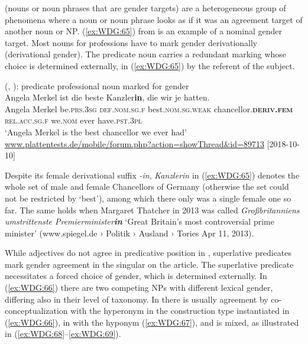 \documentclass[output=collectionpaper]{langsci/langscibook}
\begin{document}
%

 (nouns or noun phrases that are gender targets) are a heterogeneous group of phenomena where a noun or noun phrase looks as if it was an agreement target of another noun or NP. (\ref{ex:WDG:65}) from  is an example of a nominal gender target. Most  nouns for professions have to mark gender derivationally (derivational gender). The predicate noun carries a redundant marking whose choice is determined externally, in (\ref{ex:WDG:65}) by the referent of the subject.

\ea\label{ex:WDG:65}
 (, ): predicate professional noun marked for gender\\
\gll Angela	Merkel	ist	die	beste	Kanzler\textbf{in},	die	wir	je	hatten.\\
Angela	Merkel	be.\textsc{prs.3sg}	\textsc{def.nom.sg.f}	best.\textsc{nom.sg.weak}	chancellor.\textbf{\textsc{deriv.fem}}	\textsc{rel.acc.sg.f}	we.\textsc{nom}	ever	have\textsc{.pst.3pl}\\
\glt `Angela Merkel is the best chancellor we ever had'\\
\url{www.plattentests.de/mobile/forum.php?action=showThread&id=89713} [2018-10-10]\\
\z

Despite its female derivational suffix \textit{-in}, \textit{Kanzlerin} in (\ref{ex:WDG:65}) denotes the whole set of male and female Chancellors of Germany (otherwise the set could not be restricted by `best'), among which there only was a single female one so far. The same holds when Margaret Thatcher in 2013 was called \textit{Großbritanniens umstrittenste Premierminister\textbf{in}} `Great Britain's most controversial prime minister' (www.spiegel.de › Politik › Ausland › Tories Apr 11, 2013).

While adjectives do not agree in predicative position in , superlative predicates mark gender agreement in the singular on the article. The superlative predicate necessitates a forced choice of gender, which is determined externally. In (\ref{ex:WDG:66}) there are two competing NPs with different lexical gender, differing also in their level of taxonomy. In  there is usually agreement by co-conceptualization with the hyperonym in the construction type instantiated in (\ref{ex:WDG:66}), in  with the hyponym (\ref{ex:WDG:67}), and  is mixed, as illustrated in (\ref{ex:WDG:68}--\ref{ex:WDG:69}).
\end{document}
